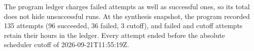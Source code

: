 
The program ledger charges failed attempts as well as successful ones, so its total does not hide unsuccessful runs. At the synthesis snapshot, the program recorded 135 attempts (96 succeeded, 36 failed, 3 cutoff), and failed and cutoff attempts retain their hours in the ledger. Every attempt ended before the absolute scheduler cutoff of 2026-09-21T11:55:19Z.

